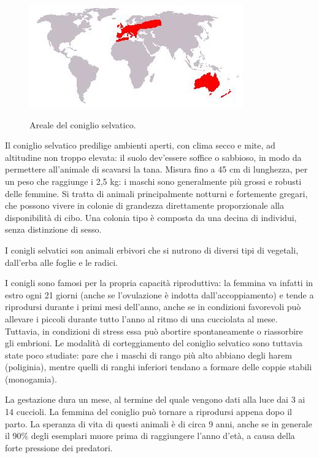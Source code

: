 \documentclass[11pt]{article}
\begin{document}
\begin{figure}[h]
    \centering
    \includegraphics[scale = 1]{ArealeDelConiglioSelvatico.jpeg}
    \label{figArealeConiglio}
    \caption{Areale del coniglio selvatico.}
\end{figure}

Il coniglio selvatico predilige ambienti aperti, con clima secco e mite, ad altitudine non troppo elevata: il suolo dev'essere soffice o sabbioso, in modo da permettere all'animale di scavarsi la tana. Misura fino a 45 cm di lunghezza, per un peso che raggiunge i 2,5 kg: i maschi sono generalmente più grossi e robusti delle femmine. Si tratta di animali principalmente notturni e fortemente gregari, che possono vivere in colonie di grandezza direttamente proporzionale alla disponibilità di cibo. Una colonia tipo è composta da una decina di individui, senza distinzione di sesso. 

I conigli selvatici son animali erbivori che si nutrono di diversi tipi di vegetali, dall'erba alle foglie e le radici. 

I conigli sono famosi per la propria capacità riproduttiva: la femmina va infatti in estro ogni 21 giorni (anche se l'ovulazione è indotta dall'accoppiamento) e tende a riprodursi durante i primi mesi dell'anno, anche se in condizioni favorevoli può allevare i piccoli durante tutto l'anno al ritmo di una cucciolata al mese. Tuttavia, in condizioni di stress essa può abortire spontaneamente o riassorbire gli embrioni.
Le modalità di corteggiamento del coniglio selvatico sono tuttavia state poco studiate: pare che i maschi di rango più alto abbiano degli harem (poliginia), mentre quelli di ranghi inferiori tendano a formare delle coppie stabili (monogamia).

La gestazione dura un mese, al termine del quale vengono dati alla luce dai 3 ai 14 cuccioli. La femmina del coniglio può tornare a riprodursi appena dopo il parto\cite{Gattoni2019Apr}.  La speranza di vita di questi animali è di circa 9 anni, anche se in generale il 90\% degli esemplari muore prima di raggiungere l'anno d'età, a causa della forte pressione dei predatori. 
\end{document}
